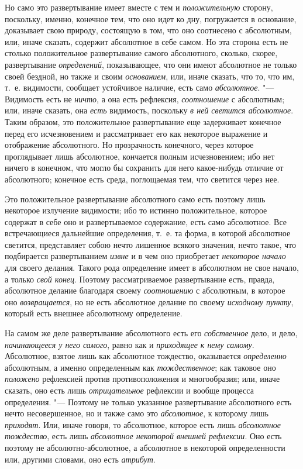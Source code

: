 Но само это развертывание имеет вместе с тем и
{\em положительную} сторону, поскольку, именно,
конечное тем, что оно идет ко дну, погружается в основание, доказывает свою
природу, состоящую в том, что оно соотнесено с абсолютным, или, иначе
сказать, содержит абсолютное в себе самом. Но эта сторона есть не столько
положительное развертывание самого абсолютного, сколько, скорее,
развертывание {\em определений}, показывающее, что они
имеют абсолютное не только своей бездной, но также и своим
{\em основанием}, или, иначе сказать, что то, что им,
т.~е. видимости, сообщает устойчивое наличие, есть само
{\em абсолютное}. "--- Видимость есть не
{\em ничто}, а она есть рефлексия,
{\em соотношение} с абсолютным; или, иначе сказать, она
{\em есть} видимость, поскольку
{\em в ней светится абсолютное}. Таким образом, это
положительное развертывание еще задерживает конечное перед его
исчезновением и рассматривает его как некоторое выражение и отображение
абсолютного. Но прозрачность конечного, через которое проглядывает лишь
абсолютное, кончается полным исчезновением; ибо нет ничего в конечном, что
могло бы сохранить для него какое-нибудь отличие от абсолютного; конечное
есть среда, поглощаемая тем, что светится через нее.

Это положительное развертывание абсолютного само есть поэтому лишь некоторое
излучение видимости; ибо то истинно положительное, которое содержат в себе
оно и развертываемое содержание, есть само абсолютное. Все встречающиеся
дальнейшие определения, т.~е. та форма, в которой абсолютное светится,
представляет собою нечто лишенное всякого значения, нечто такое, что
подбирается развертыванием {\em извне} и в чем оно
приобретает {\em некоторое начало} для своего делания.
Такого рода определение имеет в абсолютном не свое начало, а только
{\em свой конец}. Поэтому рассматриваемое развертывание
есть, правда, абсолютное делание благодаря своему
{\em соотношению} с абсолютным, в которое оно
{\em возвращается}, но не есть абсолютное делание по
своему {\em исходному пункту}, который есть внешнее
абсолютному определение.

На самом же деле развертывание абсолютного есть его
{\em собственное} дело, и дело,
{\em начинающееся у него самого}, равно как и
{\em приходящее к нему самому}. Абсолютное, взятое лишь
как абсолютное тождество, оказывается {\em определенно}
абсолютным, а именно определенным как
{\em тождественное}; как таковое оно
{\em положено} рефлексией против противоположения и
многообразия; или, иначе сказать, оно есть лишь
{\em отрицательное} рефлексии и вообще процесса
определения. "--- Поэтому не только указанное развертывание абсолютного есть
нечто несовершенное, но и также само это
{\em абсолютное}, к которому лишь
{\em приходят}. Или, иначе говоря, то абсолютное,
которое есть лишь {\em абсолютное тождество}, есть лишь
{\em абсолютное некоторой внешней рефлексии}. Оно есть
поэтому не абсолютно-абсолютное, а абсолютное в некоторой определенности
или, другими словами, оно есть {\em атрибут}.

